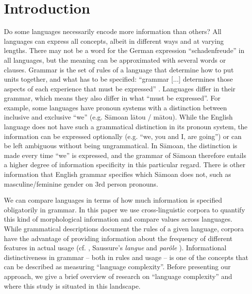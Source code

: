 \documentclass[USenglish]{article}
\begin{document}
\section{Introduction}
Do some languages necessarily encode more information than others?
All languages can express all concepts, albeit in different ways and at varying lengths. 
There may not be a word for the German expression ``schadenfreude'' in all languages, but the meaning can be approximated with several words or clauses. 
Grammar is the set of rules of a language that determine how to put units together, and what has to be specified: ``grammar [...] determines those aspects of each experience that must be expressed'' \citep[132]{boas1938language}. 
Languages differ in their grammar, which means they also differ in what ``must be expressed''. 
For example, some languages have pronoun systems with a distinction between inclusive and exclusive ``we'' (e.g. S\={a}moan l\={a}tou / m\={a}tou). 
While the English language does not have such a grammatical distinction in its pronoun system, the information can be expressed optionally (e.g. ``we, you and I, are going'') or can be left ambiguous without being ungrammatical.
In S\={a}moan, the distinction is made every time ``we'' is expressed, and the grammar of S\={a}moan therefore entails a higher degree of information specificity in this particular regard.
There is other information that English grammar specifies which S\={a}moan does not, such as masculine/feminine gender on 3rd person pronouns.

We can compare languages in terms of how much information is specified obligatorily in grammar. 
In this paper we use cross-linguistic corpora to quantify this kind of morphological information and compare values across languages.
While grammatical descriptions document the rules of a given language, corpora have the advantage of providing information about the frequency of different features in actual usage (cf. \citet{levshina_gradient}, Saussure's \textit{langue} and \textit{parôle} \citet{Saussure1916}).
Informational distinctiveness in grammar -- both in rules and usage -- is one of the concepts that can be described as measuring ``language complexity''.
Before presenting our approach, we give a brief overview of research on ``language complexity'' and where this study is situated in this landscape.
\end{document}
